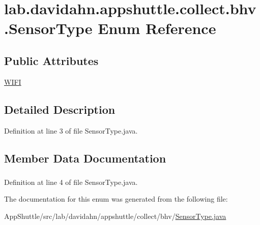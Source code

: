 \hypertarget{enumlab_1_1davidahn_1_1appshuttle_1_1collect_1_1bhv_1_1_sensor_type}{\section{lab.\-davidahn.\-appshuttle.\-collect.\-bhv.\-Sensor\-Type \-Enum \-Reference}
\label{enumlab_1_1davidahn_1_1appshuttle_1_1collect_1_1bhv_1_1_sensor_type}
}
\subsection*{\-Public \-Attributes}
\begin{DoxyCompactItemize}
\item 
\hyperlink{enumlab_1_1davidahn_1_1appshuttle_1_1collect_1_1bhv_1_1_sensor_type_a8fb8b6953966b3316fe1b1947df3756a}{\-W\-I\-F\-I}
\end{DoxyCompactItemize}


\subsection{\-Detailed \-Description}


\-Definition at line 3 of file \-Sensor\-Type.\-java.



\subsection{\-Member \-Data \-Documentation}
\hypertarget{enumlab_1_1davidahn_1_1appshuttle_1_1collect_1_1bhv_1_1_sensor_type_a8fb8b6953966b3316fe1b1947df3756a}{
\subsubsection[{\-W\-I\-F\-I}]{}}\label{enumlab_1_1davidahn_1_1appshuttle_1_1collect_1_1bhv_1_1_sensor_type_a8fb8b6953966b3316fe1b1947df3756a}


\-Definition at line 4 of file \-Sensor\-Type.\-java.



\-The documentation for this enum was generated from the following file\-:\begin{DoxyCompactItemize}
\item 
\-App\-Shuttle/src/lab/davidahn/appshuttle/collect/bhv/\hyperlink{_sensor_type_8java}{\-Sensor\-Type.\-java}\end{DoxyCompactItemize}
